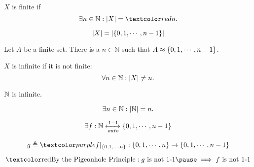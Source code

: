 \begin{frame}{}
  \begin{definition}[Finite]
    $X$ is finite if
    \[
      \exists n \in \N: |X| = \red{n}.
    \]
  \end{definition}

  \pause
  \[
    |X| = |\{0, 1, \cdots, n-1\}|
  \]

  \pause
  \begin{theorem}[UD Theorem 22.6]
    Let $A$ be a finite set. 
    There is a  $n \in \mathbb{N}$ such that $A \approx \{0, 1, \cdots, n-1\}$.
  \end{theorem}

\end{frame}

\begin{frame}{}
  \begin{definition}[Infinite]
    $X$ is infinite if it is not finite:
    \[
      \forall n \in \mathbb{N}: |X| \neq n.
    \]
  \end{definition}

  \pause
  \begin{theorem}[UD Theorem 22.3]
    $\mathbb{N}$ is infinite. 
  \end{theorem}

  \pause
  \begin{center}

    \pause
    \vspace{-0.30cm}
    \[
      \exists n \in \mathbb{N}: |\mathbb{N}| = n.
    \]

    \pause
    \vspace{-0.30cm}
    \[
      \exists f: \mathbb{N} \xleftrightarrow[onto]{1-1} \{0, 1, \cdots, n-1\}
    \]

    \pause
    \vspace{-0.30cm}
    \[
      g \triangleq \purple{f|_{\set{0, 1, \ldots, n}}}: \set{0, 1, \cdots, n} \to \set{0, 1, \cdots, n-1}
    \]

    \pause
    \vspace{-0.30cm}
    \[
      \text{\red{By the Pigeonhole Principle}}: g \text{ is not 1-1} \pause \implies f \text{ is not 1-1}
    \]
  \end{center}
\end{frame}

